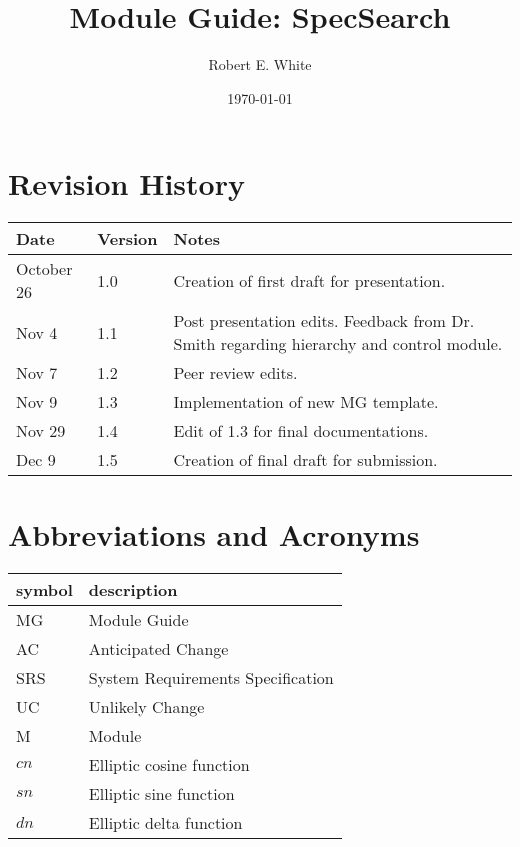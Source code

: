 \documentclass[12pt, titlepage]{article}
\begin{document}
	
	\title{Module Guide: SpecSearch} 
	\author{Robert E. White}
	\date{\today}
	
	\maketitle
	\section{Revision History}
	
	\begin{tabularx}{\textwidth}{p{3cm}p{2cm}X}
		\toprule {\bf Date} & {\bf Version} & {\bf Notes}\\
		\midrule
		October 26 & 1.0 & Creation of first draft for presentation.\\ 
		Nov 4 & 1.1 & Post presentation edits. Feedback from Dr. Smith 
		regarding 
		hierarchy and control module.\\
		Nov 7 & 1.2 & Peer review edits. \\ 
		Nov 9 & 1.3 & Implementation of new MG template. \\ 
		Nov 29& 1.4 & Edit of 1.3 for final documentations.\\ 
		Dec 9& 1.5 & Creation of final draft for submission. \\
		\bottomrule
	\end{tabularx}
	
	\newpage
	
	\tableofcontents
	
	\listoftables
	
	\listoffigures
	\section*{Abbreviations and Acronyms}
	
	\renewcommand{\arraystretch}{1.2}
	\begin{tabular}{l l} 
		\toprule		
		\textbf{symbol} & \textbf{description}\\
		\midrule 
		MG & Module Guide\\
		AC & Anticipated Change\\ 
		SRS & System Requirements Specification\\ 
		UC & Unlikely Change\\
		M & Module\\ 
		$cn$ & Elliptic cosine function\\ 
		$sn$ & Elliptic sine function\\ 
		$dn$ & Elliptic delta function \\ 
		\bottomrule
	\end{tabular}\\
	
\end{document}

